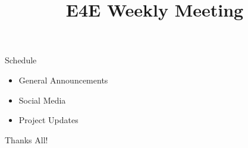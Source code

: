 \documentclass[aspectratio=169]{beamer}
\title{E4E Weekly Meeting}
\institute{UC San Diego}
\begin{document}
\maketitle
\begin{frame}{Schedule}
    \begin{itemize}
        \item General Announcements
        \item Social Media
        \item Project Updates
              \begin{enumerate}
                  
              \end{enumerate}
    \end{itemize}
\end{frame}


%         


\begin{frame}
    \centering
    Thanks All!
\end{frame}
\end{document}
